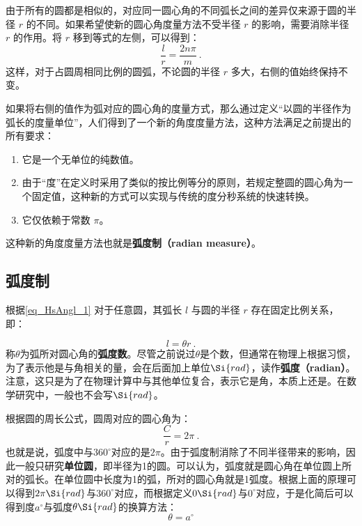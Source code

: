 由于所有的圆都是相似的，对应同一圆心角的不同弧长之间的差异仅来源于圆的半径 $r$ 的不同。如果希望使新的圆心角度量方法不受半径 $r$ 的影响，需要消除半径 $r$ 的作用。将 $r$ 移到等式的左侧，可以得到：
\begin{equation}\label{eq_HsAngl_1}
\frac{l}{r}=\frac{2n\pi}{m}~.
\end{equation}
这样，对于占圆周相同比例的圆弧，不论圆的半径 $r$ 多大，右侧的值始终保持不变。

如果将右侧的值作为弧对应的圆心角的度量方式，那么通过定义“以圆的半径作为弧长的度量单位”，人们得到了一个新的角度度量方法，这种方法满足之前提出的所有要求：
\begin{enumerate}
\item 它是一个无单位的纯数值。
\item 由于“度”在定义时采用了类似的按比例等分的原则，若规定整圆的圆心角为一个固定值，这种新的方式可以实现与传统的度分秒系统的快速转换。
\item 它仅依赖于常数 $\pi$。
\end{enumerate}
这种新的角度度量方法也就是\textbf{弧度制（radian measure）}。

\subsection{弧度制}

根据\autoref{eq_HsAngl_1} 对于任意圆，其弧长 $l$ 与圆的半径 $r$ 存在固定比例关系，即：

\begin{equation}
l = \theta r~.
\end{equation}
称$\theta$为弧所对圆心角的\textbf{弧度数}。尽管之前说过$\theta$是个数，但通常在物理上根据习惯，为了表示他是与角相关的量，会在后面加上单位$\Si{rad}$，读作\textbf{弧度（radian）}。注意，这只是为了在物理计算中与其他单位复合，表示它是角，本质上还是。在数学研究中，一般也不会写$\Si{rad}$。

根据圆的周长公式，圆周对应的圆心角为：
\begin{equation}
\frac{C}{r}=2\pi~.
\end{equation}
也就是说，弧度中与$360^\circ$对应的是$2\pi$。由于弧度制消除了不同半径带来的影响，因此一般只研究\textbf{单位圆}，即半径为1的圆。可以认为，弧度就是圆心角在单位圆上所对的弧长。在单位圆中长度为1的弧，所对的圆心角就是1弧度。根据上面的原理可以得到$2\pi\Si{rad}$与$360^\circ$对应，而根据定义$0\Si{rad}$与$0^\circ$对应，于是化简后可以得到度$a^\circ$与弧度$\theta\Si{rad}$的换算方法：
\begin{equation}
\theta=a^\circ
\end{equation}



